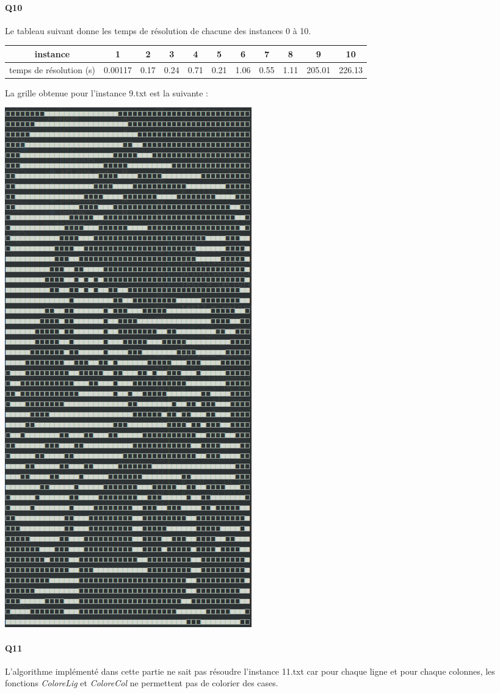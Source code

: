 \documentclass[12pt]{article}
\begin{document}
	\paragraph{Q10}
	
	Le tableau suivant donne les temps de résolution de chacune des instances 0 à 10.
	\begin{center}
		\begin{tabular}{|c|c|c|c|c|c|c|c|c|c|c| }
			\hline
			instance & 1 & 2 & 3 & 4 & 5 & 6 & 7 & 8 & 9 & 10 \\ \hline
			temps de résolution (s) & 0.00117 & 0.17 & 0.24 & 0.71 & 0.21 & 1.06 & 0.55 & 1.11 & 205.01 & 226.13 \\ \hline
		\end{tabular}
	\end{center}
	
	La grille obtenue pour l'instance 9.txt est la suivante :
	\begin{center}
		\includegraphics[scale=0.4]{instance9.png}
	\end{center}
	
	\paragraph{Q11}
	
	L'algorithme implémenté dans cette partie ne sait pas résoudre l'instance 11.txt car pour chaque ligne et pour chaque colonnes, les fonctions \textit{ColoreLig} et \textit{ColoreCol} ne permettent pas de colorier des cases.
	
\end{document}
